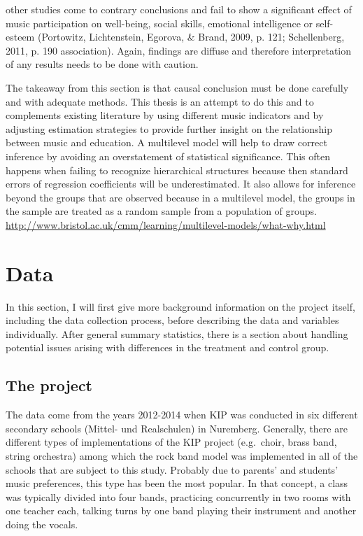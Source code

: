 \documentclass[a4, 12pt]{article}
\begin{document}
other studies come to contrary conclusions and fail to show a significant effect of music participation on well-being, social skills, emotional intelligence or self-esteem (Portowitz, Lichtenstein, Egorova, \& Brand, 2009, p. 121; Schellenberg, 2011, p. 190 association). Again, findings are diffuse and therefore interpretation of any results needs to be done with caution.

The takeaway from this section is that causal conclusion must be done carefully and with adequate methods. This thesis is an attempt to do this and to complements existing literature by using different music indicators and by adjusting estimation strategies to provide further insight on the relationship between music and education. A multilevel model will help to draw correct inference by avoiding an overstatement of statistical significance. This often happens when failing to recognize hierarchical structures because then standard errors of regression coefficients will be underestimated. It also allows for inference beyond the groups that are observed because in a multilevel model, the groups in the sample are treated as a random sample from a population of groups. \url{http://www.bristol.ac.uk/cmm/learning/multilevel-models/what-why.html}

\clearpage

\hypertarget{data}{%
\section{Data}\label{data}}

\label{ch:data}
In this section, I will first give more background information on the project itself, including the data collection process, before describing the data and variables individually. After general summary statistics, there is a section about handling potential issues arising with differences in the treatment and control group.

\hypertarget{the-project}{%
\subsection{The project}\label{the-project}}

\label{sec:project}
The data come from the years 2012-2014 when KIP was conducted in six different secondary schools (Mittel- und Realschulen) in Nuremberg. Generally, there are different types of implementations of the KIP project (e.g.~choir, brass band, string orchestra) among which the rock band model was implemented in all of the schools that are subject to this study. Probably due to parents' and students' music preferences, this type has been the most popular. In that concept, a class was typically divided into four bands, practicing concurrently in two rooms with one teacher each, talking turns by one band playing their instrument and another doing the vocals.
\end{document}

